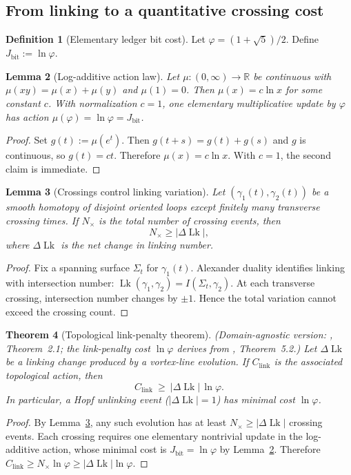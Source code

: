 \documentclass[12pt, reqno]{amsart}
\newtheorem{theorem}{Theorem}[section]
\newtheorem{lemma}[theorem]{Lemma}
\theoremstyle{definition}
\newtheorem{definition}[theorem]{Definition}
\theoremstyle{remark}
\numberwithin{equation}{section}
\newcommand{\R}{\mathbb{R}}
\begin{document}
\subsection{From linking to a quantitative crossing cost}

\begin{definition}[Elementary ledger bit cost]\label{def:Jbit}
Let $\varphi=(1+\sqrt5)/2$.  Define
$J_{\mathrm{bit}}:=\ln\varphi$.
\end{definition}

\begin{lemma}[Log-additive action law]\label{lem:log-action}
Let $\mu:(0,\infty)\to\R$ be continuous with
$\mu(xy)=\mu(x)+\mu(y)$ and $\mu(1)=0$.
Then $\mu(x)=c\ln x$ for some constant $c$.
With normalization $c=1$, one elementary multiplicative update by
$\varphi$ has action $\mu(\varphi)=\ln\varphi=J_{\mathrm{bit}}$.
\end{lemma}
\begin{proof}
Set $g(t):=\mu(e^t)$.  Then $g(t+s)=g(t)+g(s)$ and $g$ is continuous,
so $g(t)=ct$.  Therefore $\mu(x)=c\ln x$.  With $c=1$, the second
claim is immediate.
\end{proof}

\begin{lemma}[Crossings control linking variation]\label{lem:cross-link}
Let $(\gamma_1(t),\gamma_2(t))$ be a smooth homotopy of disjoint oriented
loops except finitely many transverse crossing times.
If $N_\times$ is the total number of crossing events, then
\[
N_\times\ge |\Delta\!\operatorname{Lk}|,
\]
where $\Delta\!\operatorname{Lk}$ is the net change in linking number.
\end{lemma}
\begin{proof}
Fix a spanning surface $\Sigma_t$ for $\gamma_1(t)$.
Alexander duality identifies linking with intersection number:
$\operatorname{Lk}(\gamma_1,\gamma_2)=I(\Sigma_t,\gamma_2)$.
At each transverse crossing, intersection number changes by $\pm1$.
Hence the total variation cannot exceed the crossing count.
\end{proof}

\begin{theorem}[Topological link-penalty theorem]\label{thm:LP}
\textup{(}Domain-agnostic version: \cite{F6Veto}, Theorem~2.1;
the link-penalty cost $\ln\varphi$ derives from
\cite{F1JCost}, Theorem~5.2.\textup{)}
Let $\Delta\!\operatorname{Lk}$ be a linking change produced by a
vortex-line evolution.
If $C_{\mathrm{link}}$ is the associated topological action, then
\[
C_{\mathrm{link}}\ \ge\ |\Delta\!\operatorname{Lk}|\,\ln\varphi.
\]
In particular, a Hopf unlinking event ($|\Delta\!\operatorname{Lk}|=1$)
has minimal cost $\ln\varphi$.
\end{theorem}
\begin{proof}
By Lemma~\ref{lem:cross-link}, any such evolution has at least
$N_\times\ge |\Delta\!\operatorname{Lk}|$ crossing events.
Each crossing requires one elementary nontrivial update in the
log-additive action, whose minimal cost is $J_{\mathrm{bit}}=\ln\varphi$
by Lemma~\ref{lem:log-action}.  Therefore
$C_{\mathrm{link}}\ge N_\times\ln\varphi\ge |\Delta\!\operatorname{Lk}|\ln\varphi$.
\end{proof}
\end{document}
